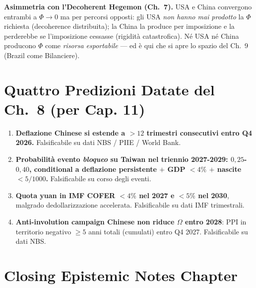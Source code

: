 \Hypoth{} \textbf{Asimmetria con l'Decoherent Hegemon (Ch.~7).} USA e
China convergono entrambi a \(\Phi \to 0\) ma per percorsi opposti: gli
USA \emph{non hanno mai prodotto} la \(\Phi\) richiesta (decoherence
distribuita); la China la produce per imposizione e la perderebbe se
l'imposizione cessasse (rigidità catastrofica). Né USA né China producono
\(\Phi\) come \emph{risorsa esportabile} --- ed è qui che si apre lo
spazio del Ch.~9 (Brazil come Bilanciere).



\section{Quattro Predizioni Datate del Ch.~8 (per Cap.
11)}\label{quattro-predizioni-datate-del-cap.-8-per-cap.-11}

\begin{enumerate}
\def\labelenumi{\arabic{enumi}.}
\tightlist
\item
  \textbf{Deflazione Chinese si estende a \(> 12\) trimestri consecutivi
  entro Q4 2026.} Falsificabile su dati NBS / PIIE / World Bank.
\item
  \textbf{Probabilità evento \emph{bloqueo} su Taiwan nel triennio
  2027-2029: \(0{,}25\)-\(0{,}40\), conditional a deflazione
  persistente \(+\) GDP \(< 4\%\) \(+\) nascite \(< 5/1000\).}
  Falsificabile su corso degli eventi.
\item
  \textbf{Quota yuan in IMF COFER \(< 4\%\) nel 2027 e \(< 5\%\) nel
  2030}, malgrado dedollarizzazione accelerata. Falsificabile su dati
  IMF trimestrali.
\item
  \textbf{Anti-involution campaign Chinese non riduce \(\Omega\) entro
  2028}: PPI in territorio negativo \(\geq 5\) anni totali (cumulati)
  entro Q4 2027. Falsificabile su dati NBS.
\end{enumerate}



\section{Closing Epistemic Notes
Chapter}\label{note-epistemiche-di-chiusura-chapter}

